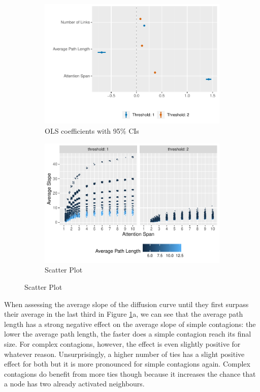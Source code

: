 \documentclass[a4paper,12pt]{article}
\begin{document}
\begin{figure}
\caption{Slopes until the Equilibrium}
\begin{subfigure}{.5\textwidth}
\centering
\includegraphics[width=\linewidth]{images/slopes_coef.pdf}
\caption{OLS coefficients with 95\% CIs}
\end{subfigure}
\begin{subfigure}{.5\textwidth}
\centering
\includegraphics[width=\linewidth]{images/slopes_scatter.pdf}
\caption{Scatter Plot}
\end{subfigure}
\label{fig:slope}
\end{figure}

When assessing the average slope of the diffusion curve until they first surpass their average in the last third in Figure \ref{fig:slope}a, we can see that the average path length has a strong negative effect on the average slope of simple contagions: the lower the average path length, the faster does a simple contagion reach its final size. For complex contagions, however, the effect is even slightly positive for whatever reason. Unsurprisingly, a higher number of ties has a slight positive effect for both but it is more pronounced for simple contagions again. Complex contagions do benefit from more ties though because it increases the chance that a node has two already activated neighbours.
\end{document}
